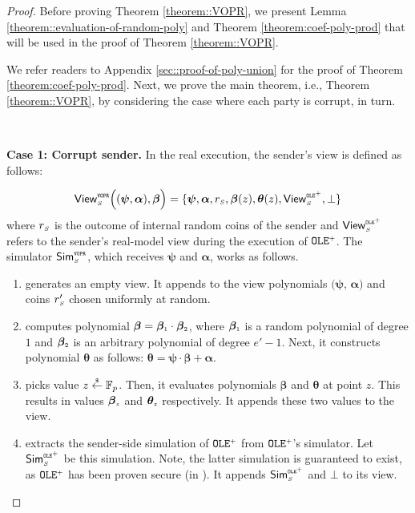 





\begin{proof}

Before proving Theorem \ref{theorem::VOPR}, we present Lemma \ref{theorem::evaluation-of-random-poly} and Theorem \ref{theorem:coef-poly-prod} that will be used in the proof of Theorem \ref{theorem::VOPR}. 






We refer readers to Appendix \ref{sec::proof-of-poly-union} for the proof of Theorem \ref{theorem:coef-poly-prod}. Next, we  prove the main theorem, i.e., Theorem \ref{theorem::VOPR}, by considering the case where each party is corrupt, in turn. 



\

\noindent\textbf{Case 1: Corrupt sender.} In the real execution, the sender's view is defined as follows: 


$$ \mathsf{View}_{\scriptscriptstyle S}^{\scriptscriptstyle \mathtt{VOPR}} \Big((\bm\psi, \bm{\alpha}), \bm\beta\Big)=\{\bm\psi, \bm{\alpha}, r_{\scriptscriptstyle S},  \bm\beta(z), \bm\theta(z), \mathsf{View}^{\scriptscriptstyle \mathtt{OLE}^{\scriptscriptstyle +}}_{\scriptscriptstyle S}, \bot \}$$
%
where $r_{\scriptscriptstyle S}$ is the outcome of internal random coins of the sender and $\mathsf{View}^{\scriptscriptstyle \mathtt{OLE}^{\scriptscriptstyle +}}_{\scriptscriptstyle S}$ refers to the sender's real-model view during the execution of  $\mathtt{OLE}^{\scriptscriptstyle +}$. The simulator $\mathsf{Sim}^{\scriptscriptstyle \mathtt{VOPR}}_{\scriptscriptstyle S}$, which receives $\bm\psi$ and $\bm \alpha$, works as follows. 
%
\begin{enumerate}
\item generates an empty view. It appends to the view polynomials $(\bm\psi$, $\bm{\alpha})$ and coins $r'_{\scriptscriptstyle S}$ chosen uniformly at random. 
%
\item computes polynomial $\bm\beta=\bm\beta_{\scriptscriptstyle 1} \cdot \bm\beta_{\scriptscriptstyle 2}$, where $\bm\beta_{\scriptscriptstyle 1}$ is a random polynomial of degree $1$ and $\bm\beta_{\scriptscriptstyle 2}$ is an arbitrary polynomial of degree $e'-1$. Next,  it constructs polynomial $\bm\theta$ as follows: $\bm\theta=\bm\psi\cdot \bm\beta+\bm \alpha$.

\item picks value $z\stackrel{\scriptscriptstyle\$}\leftarrow \mathbb{F}_{p}$. Then, it evaluates polynomials $\bm\beta$ and $\bm\theta$  at point $z$. This results in values $\bm\beta_{\scriptscriptstyle z}$ and $\bm\theta_{\scriptscriptstyle z}$ respectively. It appends these two values to the view. 
\item extracts the sender-side simulation of $\mathtt{OLE}^{\scriptscriptstyle +}$ from  $\mathtt{OLE}^{\scriptscriptstyle +}$'s simulator. Let $\mathsf{Sim}^{\scriptscriptstyle \mathtt{OLE}^{\scriptscriptstyle +}}_{\scriptscriptstyle S}$ be this simulation. Note, the latter simulation is guaranteed to exist, as $\mathtt{OLE}^{\scriptscriptstyle +}$ has been proven secure (in \cite{GhoshN19}). It appends $\mathsf{Sim}^{\scriptscriptstyle \mathtt{OLE}^{\scriptscriptstyle +}}_{\scriptscriptstyle S}$ and $\bot$ to its view. 
\end{enumerate}



\end{proof}
